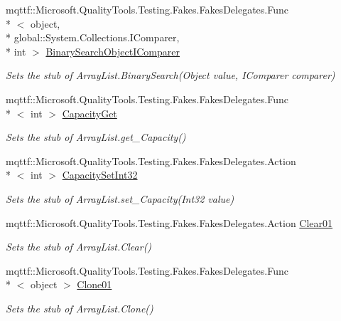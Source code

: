 \begin{DoxyCompactItemize}
mqttf\-::\-Microsoft.\-Quality\-Tools.\-Testing.\-Fakes.\-Fakes\-Delegates.\-Func\\*
$<$ object, \\*
global\-::\-System.\-Collections.\-I\-Comparer, \\*
int $>$ \hyperlink{class_system_1_1_collections_1_1_fakes_1_1_stub_array_list_a1bd8fea5f13788bba349b99915ad3ddf}{Binary\-Search\-Object\-I\-Comparer}
\begin{DoxyCompactList}\small\item\em Sets the stub of Array\-List.\-Binary\-Search(\-Object value, I\-Comparer comparer)\end{DoxyCompactList}\item 
mqttf\-::\-Microsoft.\-Quality\-Tools.\-Testing.\-Fakes.\-Fakes\-Delegates.\-Func\\*
$<$ int $>$ \hyperlink{class_system_1_1_collections_1_1_fakes_1_1_stub_array_list_a19c38a73cf7b7252b9321dd1eb1d86c5}{Capacity\-Get}
\begin{DoxyCompactList}\small\item\em Sets the stub of Array\-List.\-get\-\_\-\-Capacity()\end{DoxyCompactList}\item 
mqttf\-::\-Microsoft.\-Quality\-Tools.\-Testing.\-Fakes.\-Fakes\-Delegates.\-Action\\*
$<$ int $>$ \hyperlink{class_system_1_1_collections_1_1_fakes_1_1_stub_array_list_acfa30a51deb6c7e97c05b38edd4be087}{Capacity\-Set\-Int32}
\begin{DoxyCompactList}\small\item\em Sets the stub of Array\-List.\-set\-\_\-\-Capacity(\-Int32 value)\end{DoxyCompactList}\item 
mqttf\-::\-Microsoft.\-Quality\-Tools.\-Testing.\-Fakes.\-Fakes\-Delegates.\-Action \hyperlink{class_system_1_1_collections_1_1_fakes_1_1_stub_array_list_aff8258fd1ea86d867f45643df8cb0e96}{Clear01}
\begin{DoxyCompactList}\small\item\em Sets the stub of Array\-List.\-Clear()\end{DoxyCompactList}\item 
mqttf\-::\-Microsoft.\-Quality\-Tools.\-Testing.\-Fakes.\-Fakes\-Delegates.\-Func\\*
$<$ object $>$ \hyperlink{class_system_1_1_collections_1_1_fakes_1_1_stub_array_list_ac3abd8718b286b6287ead5dc6ce5e5f2}{Clone01}
\begin{DoxyCompactList}\small\item\em Sets the stub of Array\-List.\-Clone()\end{DoxyCompactList}\item 

\end{DoxyCompactItemize}
